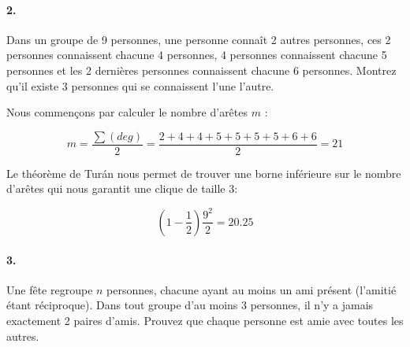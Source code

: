 \paragraph{2. } Dans un groupe de 9 personnes, une personne connaît 2 autres personnes, ces 2 personnes connaissent chacune 4 personnes, 4 personnes connaissent chacune 5 personnes et les 2 dernières personnes connaissent chacune 6 personnes. Montrez qu'il existe 3 personnes qui se connaissent l'une l'autre.

\begin{solution}
Nous commençons par calculer le nombre d'arêtes $m$ :

$$m=\frac{\sum(deg)}{2}=\frac{2+4+4+5+5+5+5+6+6}{2}=21$$

Le théorème de Turán nous permet de trouver une borne inférieure sur le nombre d'arêtes qui nous garantit une clique de taille 3:

$$\left(1-\frac{1}{2}\right)\frac{9^2}{2}=20.25$$
\end{solution}

\paragraph{3. } Une fête regroupe $n$ personnes, chacune ayant au moins un ami présent (l'amitié étant réciproque). Dans tout groupe d'au moins 3 personnes, il n'y a jamais exactement 2 paires d'amis. Prouvez que chaque personne est amie avec toutes les autres.

